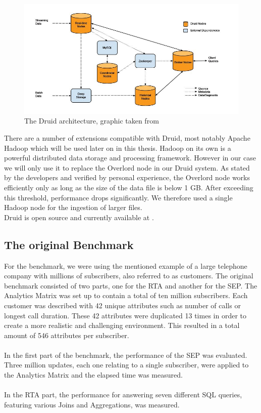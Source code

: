 \documentclass[11pt,singlecolumn]{scrartcl}
\begin{document}
\begin{figure}[h]
\includegraphics[scale=0.65]{druid.jpg}
\caption{The Druid architecture, graphic taken from \cite{druid}}
\end{figure}

There are a number of extensions compatible with Druid, most notably Apache Hadoop \cite{hadoop} which will be used later on in this thesis. Hadoop on its own is a powerful distributed data storage and processing framework. However in our case we will only use it to replace the Overlord node in our Druid system. As stated by the developers and verified by personal experience, the Overlord node works efficiently only as long as the size of the data file is below 1 GB. After exceeding this threshold, performance drops significantly. We therefore used a single Hadoop node for the ingestion of larger files.
\\[1cm]
Druid is open source and currently available at \cite{druidon}.

\clearpage

\subsection{The original Benchmark}
For the benchmark, we were using the mentioned example of a large telephone company with millions of subscribers, also referred to as customers. The original benchmark consisted of two parts, one for the RTA and another for the SEP. The Analytics Matrix was set up to contain a total of ten million subscribers. Each customer was described with 42 unique attributes such as number of calls or longest call duration. These 42 attributes were duplicated 13 times in order to create a more realistic and challenging environment. This resulted in a total amount of 546 attributes per subscriber.\\\\
In the first part of the benchmark, the performance of the SEP was evaluated. Three million updates, each one relating to a single subscriber, were applied to the Analytics Matrix and the elapsed time was measured.\\\\In the RTA part, the performance for answering seven different SQL queries, featuring various Joins and Aggregations, was measured. 
\clearpage
\end{document}
